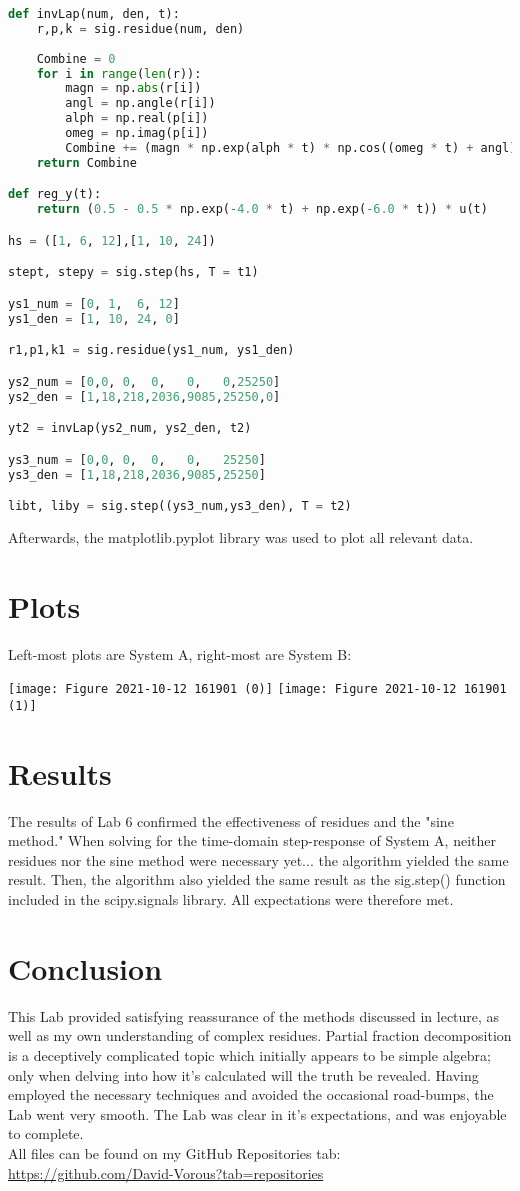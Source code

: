 \documentclass[12pt]{report}
\begin{document}
\begin{lstlisting}[language=Python]
def invLap(num, den, t):
    r,p,k = sig.residue(num, den)
    
    Combine = 0
    for i in range(len(r)):
        magn = np.abs(r[i])
        angl = np.angle(r[i])
        alph = np.real(p[i])
        omeg = np.imag(p[i])
        Combine += (magn * np.exp(alph * t) * np.cos((omeg * t) + angl)) * u(t) 
    return Combine

def reg_y(t):
    return (0.5 - 0.5 * np.exp(-4.0 * t) + np.exp(-6.0 * t)) * u(t)

hs = ([1, 6, 12],[1, 10, 24])

stept, stepy = sig.step(hs, T = t1)

ys1_num = [0, 1,  6, 12]
ys1_den = [1, 10, 24, 0]

r1,p1,k1 = sig.residue(ys1_num, ys1_den)

ys2_num = [0,0, 0,  0,   0,   0,25250]
ys2_den = [1,18,218,2036,9085,25250,0]

yt2 = invLap(ys2_num, ys2_den, t2)

ys3_num = [0,0, 0,  0,   0,   25250]
ys3_den = [1,18,218,2036,9085,25250]

libt, liby = sig.step((ys3_num,ys3_den), T = t2)
\end{lstlisting}
Afterwards, the matplotlib.pyplot library was used to plot all relevant data.


\section{Plots}
Left-most plots are System A, right-most are System B:
\begin{center}
    \texttt{[image: Figure 2021-10-12 161901 (0)]}
    \texttt{[image: Figure 2021-10-12 161901 (1)]}
\end{center}

\section{Results}
The results of Lab 6 confirmed the effectiveness of residues and the "sine method." When solving for the time-domain step-response of System A, neither residues nor the sine method were necessary yet... the algorithm yielded the same result. Then, the algorithm also yielded the same result as the sig.step() function included in the scipy.signals library. All expectations were therefore met.

\section{Conclusion}
This Lab provided satisfying reassurance of the methods discussed in lecture, as well as my own understanding of complex residues. Partial fraction decomposition is a deceptively complicated topic which initially appears to be simple algebra; only when delving into how it's calculated will the truth be revealed. Having employed the necessary techniques and avoided the occasional road-bumps, the Lab went very smooth. The Lab was clear in it's expectations, and was enjoyable to complete.\\

All files can be found on my GitHub Repositories tab:\\
\url{https://github.com/David-Vorous?tab=repositories}
\end{document}
